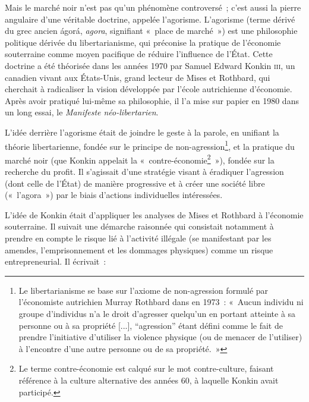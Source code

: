 
Mais le marché noir n'est pas qu'un phénomène controversé~; c'est aussi la pierre angulaire d'une véritable doctrine, appelée l'agorisme. L'agorisme (terme dérivé du grec ancien \foreignlanguage{greek}{ágorá}, \emph{agora}, signifiant «~place de marché~») est une philosophie politique dérivée du libertarianisme, qui préconise la pratique de l'économie souterraine comme moyen pacifique de réduire l'influence de l'État. Cette doctrine a été théorisée dans les années 1970 par Samuel Edward Konkin \textsc{iii}, un canadien vivant aux États-Unis, grand lecteur de Mises et Rothbard, qui cherchait à radicaliser la vision développée par l'école autrichienne d'économie. Après avoir pratiqué lui-même sa philosophie, il l'a mise sur papier en 1980 dans un long essai, le \emph{Manifeste néo-libertarien}.

L'idée derrière l'agorisme était de joindre le geste à la parole, en unifiant la théorie libertarienne, fondée sur le principe de non-agression\footnote{Le libertarianisme se base sur l'axiome de non-agression formulé par l'économiste autrichien Murray Rothbard dans  en 1973~: «~Aucun individu ni groupe d'individus n'a le droit d'agresser quelqu'un en portant atteinte à sa personne ou à sa propriété [...], “agression” étant défini comme le fait de prendre l'initiative d'utiliser la violence physique (ou de menacer de l'utiliser) à l'encontre d'une autre personne ou de sa propriété.~»}, et la pratique du marché noir (que Konkin appelait la «~contre-économie\footnote{Le terme contre-économie est calqué sur le mot contre-culture, faisant référence à la culture alternative des années 60, à laquelle Konkin avait participé.}~»), fondée sur la recherche du profit. Il s'agissait d'une stratégie visant à éradiquer l'agression (dont celle de l'État) de manière progressive et à créer une société libre («~l'agora~») par le biais d'actions individuelles intéressées.

L'idée de Konkin était d'appliquer les analyses de Mises et Rothbard à l'économie souterraine. Il suivait une démarche raisonnée qui consistait notamment à prendre en compte le risque lié à l'activité illégale (se manifestant par les amendes, l'emprisonnement et les dommages physiques) comme un risque entrepreneurial. Il écrivait~:

